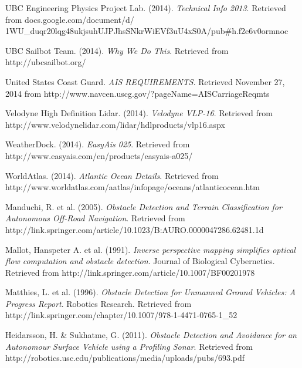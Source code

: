 \begin{thebibliography}{99}
 UBC Engineering Physics Project Lab. (2014). \textit{Technical Info 2013}. Retrieved from docs.google.com/document/d/\\1WU\_duqr20lqg48ukjsuhUJPJhsSNkrWiEVf3uU4xS0A/pub\#h.f2e6v0ormnoc

 UBC Sailbot Team. (2014). \textit{Why We Do This}. Retrieved from http://ubcsailbot.org/

 United States Coast Guard. \textit{AIS REQUIREMENTS}. Retrieved November 27, 2014 from http://www.navcen.uscg.gov/?pageName=AISCarriageReqmts

 Velodyne High Definition Lidar. (2014). \textit{Velodyne VLP-16}. Retrieved from http://www.velodynelidar.com/lidar/hdlproducts/vlp16.aspx

 WeatherDock. (2014). \textit{EasyAis 025}. Retrieved from http://www.easyais.com/en/products/easyais-a025/

 WorldAtlas. (2014). \textit{Atlantic Ocean Details}. Retrieved from http://www.worldatlas.com/aatlas/infopage/oceans/atlanticocean.htm

 Manduchi, R. et al. (2005). \textit{Obstacle Detection and Terrain Classification for Autonomous Off-Road Navigation}. Retrieved from http://link.springer.com/article/10.1023/B:AURO.0000047286.62481.1d

 Mallot, Hanspeter A. et al. (1991). \textit{Inverse perspective mapping simplifies optical flow computation and obstacle detection}. Journal of Biological Cybernetics. Retrieved from http://link.springer.com/article/10.1007/BF00201978

 Matthies, L. et al. (1996). \textit{Obstacle Detection for Unmanned Ground Vehicles: A Progress Report}. Robotics Research. Retrieved from http://link.springer.com/chapter/10.1007/978-1-4471-0765-1\_52

 Heidarsson, H. \& Sukhatme, G. (2011). \textit{Obstacle Detection and Avoidance for an Autonomour Surface Vehicle using a Profiling Sonar}. Retrieved from http://robotics.usc.edu/publications/media/uploads/pubs/693.pdf


\end{thebibliography}